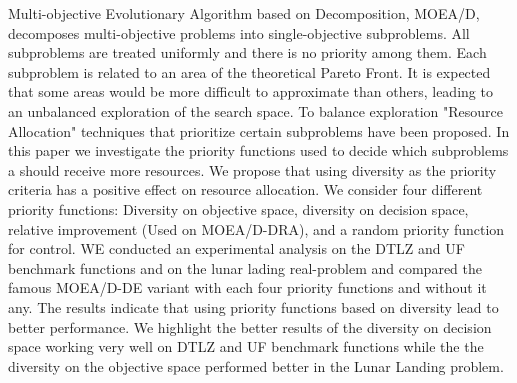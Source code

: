 Multi-objective Evolutionary Algorithm based on Decomposition, MOEA/D, decomposes multi-objective problems into single-objective subproblems. All subproblems are treated uniformly and there is no priority among them. Each subproblem is related to an area of the theoretical Pareto Front. It is expected that some areas would be more difficult to approximate than others, leading to an unbalanced exploration of the search space. To balance exploration "Resource Allocation" techniques that prioritize certain subproblems have been proposed. In this paper we investigate the priority functions used to decide  which subproblems a should receive more resources. We propose that using diversity as the priority criteria has a positive effect on resource allocation. We consider four different priority functions: Diversity on objective space, diversity on decision space, relative improvement (Used on MOEA/D-DRA), and a random priority function for control. WE conducted an experimental analysis on the DTLZ and UF benchmark functions and on the lunar lading real-problem and compared the famous MOEA/D-DE variant with each four priority functions and without it any. The results indicate that using priority functions based on diversity lead to better performance. We highlight the better results of the diversity on decision space working very well on DTLZ and UF benchmark functions while the the diversity on the objective space performed better in the Lunar Landing problem.
